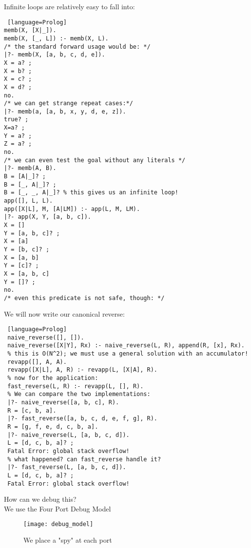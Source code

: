 \documentclass[../../lecture_notes.tex]{subfiles}
\begin{document}
\begin{center}  \end{center}

Infinite loops are relatively easy to fall into:
\begin{lstlisting} [language=Prolog]
memb(X, [X|_]).
memb(X, [_, L]) :- memb(X, L).
/* the standard forward usage would be: */
|?- memb(X, [a, b, c, d, e]).
X = a? ;
X = b? ;
X = c? ;
X = d? ;
no.
/* we can get strange repeat cases:*/
|?- memb(a, [a, b, x, y, d, e, z]).
true? ;
X=a? ;
Y = a? ;
Z = a? ;
no.
/* we can even test the goal without any literals */
|?- memb(A, B).
B = [A|_]? ;
B = [_, A|_]? ;
B = [_, _, A|_]? % this gives us an infinite loop!
app([], L, L).
app([X|L], M, [A|LM]) :- app(L, M, LM).
|?- app(X, Y, [a, b, c]).
X = []
Y = [a, b, c]? ;
X = [a]
Y = [b, c]? ;
X = [a, b]
Y = [c]? ;
X = [a, b, c]
Y = []? ;
no.
/* even this predicate is not safe, though: */
\end{lstlisting}
\noindent We will now write our canonical reverse:
\begin{lstlisting} [language=Prolog]
 naive_reverse([], []).
 naive_reverse([X|Y], Rx) :- naive_reverse(L, R), append(R, [x], Rx).
 % this is O(N^2); we must use a general solution with an accumulator!
 revapp([], A, A).
 revapp([X|L], A, R) :- revapp(L, [X|A], R).
 % now for the application:
 fast_reverse(L, R) :- revapp(L, [], R).
 % We can compare the two implementations:
 |?- naive_reverse([a, b, c], R).
 R = [c, b, a].
 |?- fast_reverse([a, b, c, d, e, f, g], R).
 R = [g, f, e, d, c, b, a].
 |?- naive_reverse(L, [a, b, c, d]).
 L = [d, c, b, a]? ;
 Fatal Error: global stack overflow!
 % what happened? can fast_reverse handle it?
 |?- fast_reverse(L, [a, b, c, d]).
 L = [d, c, b, a]? ;
 Fatal Error: global stack overflow!
\end{lstlisting}
\newpage
How can we debug this?\\
\indent We use the Four Port Debug Model
\begin{figure}[H]
	\centering
	\texttt{[image: debug\_model]}
	\caption{We place a "spy" at each port}
	\label{fig:test}
\end{figure}
\end{document}

